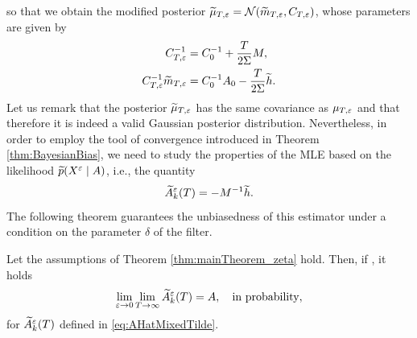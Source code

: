 \documentclass[10pt]{article}
\begin{document}
so that we obtain the modified posterior $\widetilde \mu_{T,\varepsilon} = \mathcal N(\widetilde m_{T, \varepsilon}, C_{T, \varepsilon})$, whose parameters are given by
\begin{equation}
\begin{aligned}
	C_{T, \varepsilon}^{-1} &= C_0^{-1} + \frac{T}{2\Sigma} M, \\
	C_{T,\varepsilon}^{-1}\widetilde m_{T,\varepsilon} &= C_0^{-1}A_0 - \frac{T}{2\Sigma} \widetilde h. 
\end{aligned}	
\end{equation}
Let us remark that the posterior $\widetilde \mu_{T,\varepsilon}$ has the same covariance as $\mu_{T,\varepsilon}$ and that therefore it is indeed a valid Gaussian posterior distribution. Nevertheless, in order to employ the tool of convergence introduced in Theorem \ref{thm:BayesianBias}, we need to study the properties of the MLE based on the likelihood $\widetilde p(X^\varepsilon \mid A)$, i.e., the quantity
\begin{equation}\label{eq:AHatMixedTilde}
	\widetilde A^\varepsilon_k(T) = - M^{-1} \widetilde h.
\end{equation}
The following theorem guarantees the unbiasedness of this estimator under a condition on the parameter $\delta$ of the filter.
\begin{theorem}\label{thm:mainTheoremTilde} Let the assumptions of Theorem \ref{thm:mainTheorem_zeta} hold. Then, if , it holds
	\begin{equation}
	\lim_{\varepsilon \to 0} \lim_{T \to \infty} \widetilde A^\varepsilon_k(T) = A, \quad \text{in probability},
	\end{equation} 
	for $\widetilde A^\varepsilon_k(T)$ defined in \eqref{eq:AHatMixedTilde}.
\end{theorem}
\end{document}

